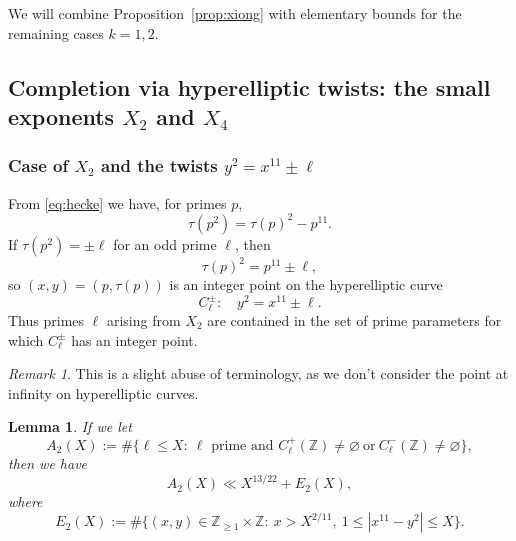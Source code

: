\documentclass[12pt]{amsart}
\newtheorem{lemma}[theorem]{Lemma}
\theoremstyle{remark}
\newtheorem{remark}[theorem]{Remark}
\numberwithin{equation}{section}
\begin{document}
We will combine Proposition~\ref{prop:xiong} with elementary bounds for the remaining cases $k=1,2$.

\subsection{Completion via hyperelliptic twists: the small exponents $X_2$ and $X_4$}\label{subsec:22}

\subsubsection*{Case of $X_2$ and the twists $y^2=x^{11}\pm \ell$}

From \eqref{eq:hecke} we have, for primes $p$,
\begin{equation}\label{eq:p2}
\tau(p^2)=\tau(p)^2-p^{11}.
\end{equation}
If $\tau(p^2)=\pm \ell$ for an odd prime $\ell$, then
\begin{equation}\label{eq:Ccurve}
\tau(p)^2=p^{11}\pm \ell,
\end{equation}
so $(x,y)=(p,\tau(p))$ is an integer point on the hyperelliptic curve
\[
C_{\ell}^{\pm}:\quad y^2=x^{11}\pm \ell.
\]
Thus primes $\ell$ arising from $X_2$ are contained in the set of prime parameters for which $C_{\ell}^{\pm}$
has an integer point.

\begin{remark} This is a slight abuse of terminology, as we don't consider the point at infinity on hyperelliptic curves.
\end{remark}


\begin{lemma}\label{lem:X2count}
If we let
\[
A_2(X):=\#\{\ell\le X:\ \ell \text{ prime and } C_{\ell}^{+}(\mathbb Z)\neq \varnothing\ \text{or}\ C_{\ell}^{-}(\mathbb Z)\neq \varnothing\},
\]
then we have
\[
A_2(X)\ll X^{13/22}+E_2(X),
\]
where
\[
E_2(X):=\#\{(x,y)\in\mathbb Z_{\ge 1}\times\mathbb Z:\ x> X^{2/11},\ 1\le |x^{11}-y^2|\le X\}.
\]
\end{lemma}
\end{document}
